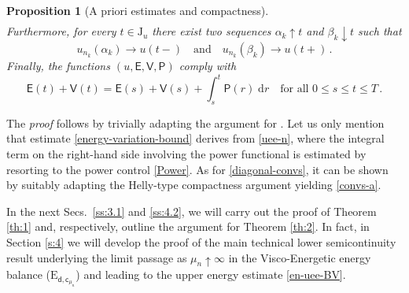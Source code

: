 \documentclass[a4paper,10pt,reqno]{amsart} %
\newtheorem{proposition}[theorem]{Proposition}
\numberwithin{equation}{section}
\newcommand{\up}{\uparrow}
\newcommand{\down}{\downarrow}
\def\dd{\;\!\mathrm{d}} %
\newcommand{\mdn}{\mathsf{d}}
\newcommand{\lli}[2]{{#1}({#2}{-})}
\newcommand{\rli}[2]{{#1}({#2}{+})}
\newcommand{\jump}[1]{\mathrm{J}_{#1}}
\newcommand{\vecostnamep}[1]{\mathsf{c}_{#1}}
\newcommand{\limE}{\mathsf{E}}
\newcommand{\limV}{\mathsf{V}}
\newcommand{\limP}{\mathsf{P}}
\newcommand{\RRR}{\color{red}}
\newcommand{\EEE}{\color{black}}
\begin{document}
\begin{proposition}[A priori estimates and compactness]
\begin{subequations}
\begin{align}
\end{align}
\end{subequations}
Furthermore,
for every $t\in \jump u$ there exist two sequences $\alpha_k\up t$ and $\beta_k \down t$ such that
\begin{equation}
\label{diagonal-convs}
u_{n_k}(\alpha_k) \to \lli u t \quad \text{and} \quad  u_{n_k}(\beta_k) \to \rli u t\,.
\end{equation}
Finally,
 the functions $(u,\limE,\limV,\limP)$ comply with 
\begin{equation}
\label{limuee}
\limE(t)+ \limV(t) = \limE(s) +\limV(s)+\int_s^t \limP(r)  \dd r \quad \text{for all } 0\leq s \leq t \leq T\,.
\end{equation}
\end{proposition}
The \emph{proof} follows by trivially adapting the argument for \cite[Thm.\ 7.2]{SavMin16}. %
Let us only mention that estimate \eqref{energy-variation-bound} derives from \eqref{uee-n}, where the integral term on the right-hand side involving the power functional is estimated by resorting to the power control \eqref{Power}. 
 As for \eqref{diagonal-convs}, it can be shown by suitably adapting the Helly-type compactness argument yielding \eqref{convs-a}. 
\par
In the next Secs.\ \ref{ss:3.1} and \ref{ss:4.2}, we will carry out the proof of Theorem \ref{th:1} and, respectively, outline the argument for Theorem \ref{th:2}. In fact,   in  Section \ref{s:4} we will develop the proof of the main technical lower semicontinuity result underlying the limit passage as $\mu_n\up\infty$ in the Visco-Energetic energy balance  ($\mathrm{E}_{\mdn,\vecostnamep{\mu_n}}$)  and  leading to the upper energy estimate \eqref{en-uee-BV}.
\end{document}
